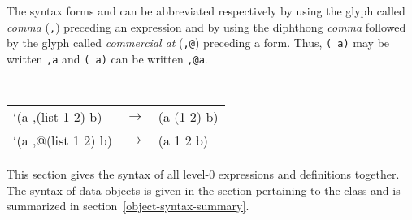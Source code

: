 \begin{optDefinition}
The syntax forms  and  can be
abbreviated respectively by using the glyph called {\em comma}
(\verb+,+) preceding an
expression and by using the diphthong {\em comma} followed by the glyph called
{\em commercial at} (\verb+,@+)
preceding a form.  Thus, {\tt ( a)} may be written {\tt ,a}
and {\tt ( a)} can be written {\tt ,@a}.
%
\examples
{\tt
\begin{tabular}{lll}
    `(a ,(list 1 2) b) & $\rightarrow$ & (a (1 2) b)\\
    `(a ,@(list 1 2) b) & $\rightarrow$ & (a 1 2 b)
\end{tabular}}
%
\end{optDefinition}

%
\begin{optDefinition}
\noindent
This section gives the syntax of all level-0 expressions and definitions
together.  The syntax of data objects is given in the section pertaining to the
class and is summarized in section~\ref{object-syntax-summary}.  \raggedbottom
%
%

%

%

\flushbottom
\end{optDefinition}
